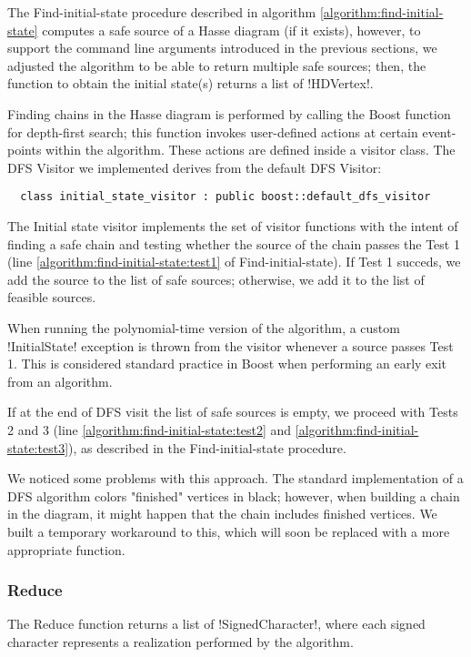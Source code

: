 The Find-initial-state procedure described in algorithm \ref{algorithm:find-initial-state} computes a safe source of a Hasse diagram (if it exists), however, to support the command line arguments introduced in the previous sections, we adjusted the algorithm to be able to return multiple safe sources; then, the function to obtain the initial state(s) returns a list of !HDVertex!.

Finding chains in the Hasse diagram is performed by calling the Boost function for depth-first search; this function invokes user-defined actions at certain event-points within the algorithm.
These actions are defined inside a visitor class.
The DFS Visitor we implemented derives from the default DFS Visitor:

\begin{lstlisting}
  class initial_state_visitor : public boost::default_dfs_visitor
\end{lstlisting}

The Initial state visitor implements the set of visitor functions with the intent of finding a safe chain and testing whether the source of the chain passes the Test 1 (line \ref{algorithm:find-initial-state:test1} of Find-initial-state).
If Test 1 succeds, we add the source to the list of safe sources; otherwise, we add it to the list of feasible sources.

When running the polynomial-time version of the algorithm, a custom !InitialState! exception is thrown from the visitor whenever a source passes Test 1.
This is considered standard practice in Boost when performing an early exit from an algorithm.

If at the end of DFS visit the list of safe sources is empty, we proceed with Tests 2 and 3 (line \ref{algorithm:find-initial-state:test2} and \ref{algorithm:find-initial-state:test3}), as described in the Find-initial-state procedure.

We noticed some problems with this approach.
The standard implementation of a DFS algorithm colors "finished" vertices in black; however, when building a chain in the diagram, it might happen that the chain includes finished vertices.
We built a temporary workaround to this, which will soon be replaced with a more appropriate function.

\subsubsection{Reduce}\label{section:reduce}

The Reduce function returns a list of !SignedCharacter!, where each signed character represents a realization performed by the algorithm.

